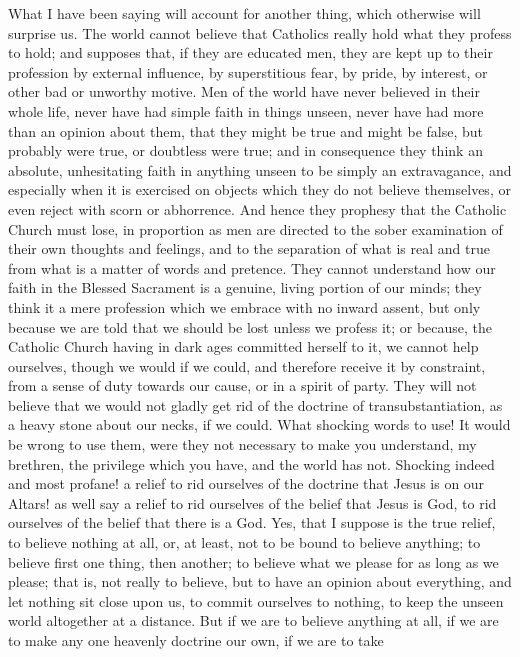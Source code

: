 What I have been saying will account for another thing, which
otherwise will surprise us. The world cannot believe that Catholics
really hold what they profess to hold; and supposes that, if they are
educated men, they are kept up to their profession by external
influence, by superstitious fear, by pride, by interest, or other bad
or unworthy motive. Men of the world have never believed in their
whole life, never have had simple faith in things unseen, never have
had more than an opinion about them, that they might be true and might
be false, but probably were true, or doubtless were true; and in
consequence they think an absolute, unhesitating faith in anything
unseen to be simply an extravagance, and especially when it is
exercised on objects which they do not believe themselves, or even
reject with scorn or abhorrence. And hence they prophesy that the
Catholic Church must lose, in proportion as men are directed to the
sober examination of their own thoughts and feelings, and to the
separation of what is real and true from what is a matter of words and
pretence. They cannot understand how our faith in the Blessed
Sacrament is a genuine, living portion of our minds; they think it a
mere profession which we embrace with no inward assent, but only
because we are told that we should be lost unless we profess it; or
because, the Catholic Church having in dark ages committed herself to
it, we cannot help ourselves, though we would if we could, and
therefore receive it by constraint, from a sense of duty towards our
cause, or in a spirit of party. They will not believe that we would
not gladly get rid of the doctrine of transubstantiation, as a heavy
stone about our necks, if we could. What shocking words to use! It
would be wrong to use them, were they not necessary to make you
understand, my brethren, the privilege which you have, and the world
has not. Shocking indeed and most profane! a relief to rid ourselves
of the doctrine that Jesus is on our Altars! as well say a relief to
rid ourselves of the belief that Jesus is God, to rid ourselves of the
belief that there is a God. Yes, that I suppose is the true relief, to
believe nothing at all, or, at least, not to be bound to believe
anything; to believe first one thing, then another; to believe what we
please for as long as we please; that is, not really to believe, but
to have an opinion about everything, and let nothing sit close upon
us, to commit ourselves to nothing, to keep the unseen world
altogether at a distance. But if we are to believe anything at all, if
we are to make any one heavenly doctrine our own, if we are to take
